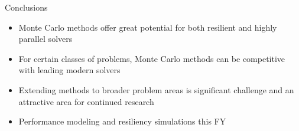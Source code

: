 \documentclass{beamer}
\begin{document}
\begin{frame}{Conclusions}
  \begin{itemize}
  \item Monte Carlo methods offer great potential for both resilient and
    highly parallel solvers
    \vfill
  \item For certain classes of problems, Monte Carlo methods can be
    competitive with leading modern solvers
    \vfill
    \item Extending methods to broader problem areas is significant challenge
      and an attractive area for continued research
      \vfill
    \item Performance modeling and resiliency simulations this FY
  \end{itemize}
\end{frame}

\end{document}

